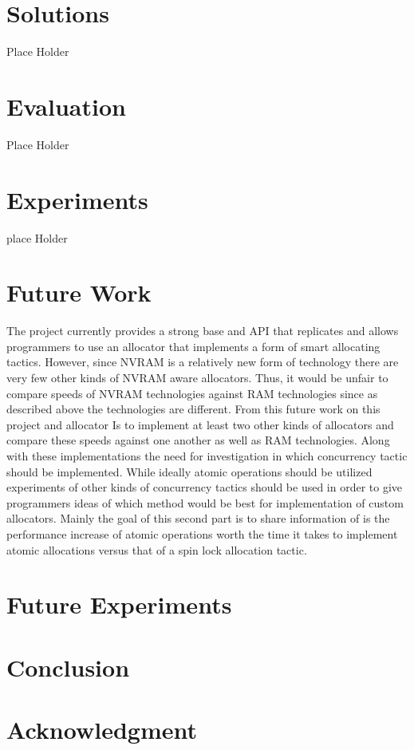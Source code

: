 \documentclass[conference]{IEEEtran}
\begin{document}
\section{Solutions}
Place Holder

\section{Evaluation}
Place Holder

\section{Experiments}
place Holder

\section{Future Work}
The project currently provides a strong base and API that replicates and allows programmers to use an allocator that implements a form of smart allocating tactics. However, since NVRAM is a relatively new form of technology there are very few other kinds of NVRAM aware allocators. Thus, it would be unfair to compare speeds of NVRAM technologies against RAM technologies since as described above the technologies are different. From this future work on this project and allocator Is to implement at least two other kinds of allocators and compare these speeds against one another as well as RAM technologies. Along with these implementations the need for investigation in which concurrency tactic should be implemented. While ideally atomic operations should be utilized experiments of other kinds of concurrency tactics should be used in order to give programmers ideas of which method would be best for implementation of custom allocators. Mainly the goal of this second part is to share information of is the performance increase of atomic operations worth the time it takes to implement atomic allocations versus that of a spin lock allocation tactic. 

\section{Future Experiments}

\section{Conclusion}

\section{Acknowledgment}
\end{document}
